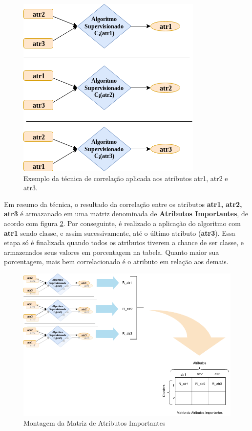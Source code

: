 \begin{figure}[h!]
        \centering
        \includegraphics[scale=0.7]{figs/tecnicamodeloComp.png}
        \caption{Exemplo da técnica de correlação aplicada aos atributos atr1, atr2 e atr3. } \label{fig:tecnicamodelocomp}
\end{figure}


Em resumo da técnica, o resultado da correlação entre os atributos \textbf{atr1, atr2, atr3}  é armazanado em uma matriz denominada de \textbf{Atributos Importantes}, de acordo com figura \ref{fig:matribimp}. Por conseguinte, é realizado a aplicação do algoritmo com \textbf{atr1} sendo classe, e assim sucessivamente, até o último atributo (\textbf{atr3}). Essa etapa só é finalizada quando todos os atributos tiverem a chance de ser classe, e armazenados seus valores em porcentagem na tabela. Quanto maior sua porcentagem, mais bem correlacionado é o atributo em relação aos demais.


\begin{figure}[h!]
        \centering
        \includegraphics[scale=0.5]{figs/montagem_matrizAtribImp.png}
        \caption{Montagem da Matriz de Atributos Importantes } \label{fig:matribimp}
\end{figure}



